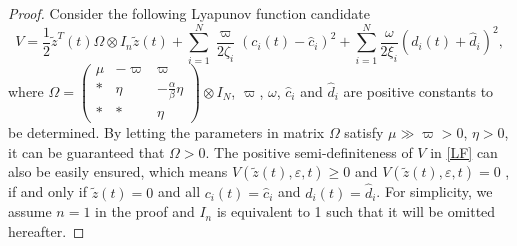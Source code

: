 \documentclass[review]{elsarticle}
\begin{document}
\begin{proof}
	Consider the following Lyapunov function candidate 
	\begin{equation}\label{LF}
	V = \frac{1}{2}\tilde z^T(t) \Omega\otimes I_n \tilde{z}(t)  + \sum_{i=1}^{N} \frac{\varpi }{2\zeta_i}(c_i (t) - \hat c_i) ^2 +  \sum_{i=1}^{N} \frac{\omega}{2\xi_i}(d_i (t) + \hat{d}_i)^2,
	\end{equation}
	where $\Omega = \begin{pmatrix}
	\mu& -\varpi &\varpi\\
	* & \eta& -\frac{\alpha}{\beta}\eta \\
	*&*&\eta
	\end{pmatrix}\otimes I_N$, $\varpi$, $\omega$, $\hat c_i$ and $\hat d_i $ are positive constants to be determined.  By letting the parameters in matrix $\Omega$ satisfy $\mu \gg \varpi >0 $, $\eta >0$, it can be guaranteed that $\Omega>0$. The positive semi-definiteness of $V$ in \eqref{LF} can also be easily ensured, which means $V(\tilde z(t) ,\varepsilon, t) \geq 0 $ and  $V(\tilde z(t) ,\varepsilon, t)= 0$ , if and only if $\tilde{z} (t) = 0$ and all $c_i(t) = \hat c_i$ and $d_i(t) = \hat d_i$. 
	For simplicity, we assume $n=1$ in the proof and $I_n$ is equivalent to 1 such that it will be omitted hereafter.
	

\end{proof}
\end{document}
